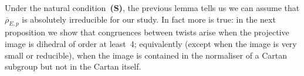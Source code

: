 \documentclass[12pt, reqno]{amsart}
\newcommand{\PP}{\mathbb{P}}
\newcommand{\Z}{\mathbb{Z}}
\newcommand{\rhobar}{{\overline{\rho}}}
\numberwithin{equation}{section}
\theoremstyle{definition}
\theoremstyle{remark}
\begin{document}
Under the natural condition~{\bf (S)}, the 
previous lemma tells us we can assume
that $\rhobar_{E,p}$ is absolutely irreducible for our study. In fact more is true:
in the next proposition we show that congruences between 
twists arise when the projective image is dihedral of order at least~4; equivalently
(except when the image is very small or reducible), when the image is
contained in the normaliser of a Cartan subgroup but not in the Cartan
itself.

\begin{comment}
In the rest of this section we will study elliptic curves whose
mod~$p$ representations are projectively dihedral: that is, such that
$\PP \rhobar_{E,p} (G_K) \simeq D_{n}$.  This includes, but is not
restricted to, curves with CM where the extra endomorphisms are not
defined over the ground field.  In the following two subsections we
specialise to the case of curves CM by $\Z[\zeta_4]$ and $\Z[\zeta_6]$
where quartic and sextic twists are possible.  In this subsection we
restrict to quadratic twists, together with the special quartic twist
(see Remark~\ref{R:2-isog}) which becomes trivial over a quadratic
extension.

When $\PP \rhobar_{E,p} (G_K) \simeq D_{n}$, let~$K(\sqrt{d})$ be the
quadratic extension cut out by a cyclic subgroup~$C_n<D_n$ of
index~$2$.  This cyclic subgroup is unique, except when $n=2$ when
there are three possibilities for~$C_2<D_2\cong C_2\times C_2$, and
hence for $K(\sqrt{d})$. In this situation, we will see that
$E[p]\cong E^d[p]$ as $G_K$-modules, and we will determine the
symplectic type of this isomorphism.  This is in accordance with
Theorem~\ref{T:constraint}, since in passing from $K$
to~$K(\sqrt{d})$, the projective image becomes cyclic and hence
(absolutely) reducible.

First we exclude some degenerate cases, where the projective image is
very small, in which case this symplectic type is not well-defined.


\end{comment}
\end{document}
